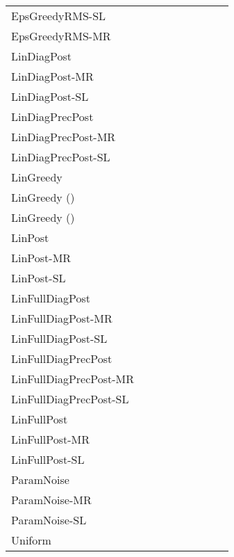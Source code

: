 \documentclass{article} \usepackage{iclr2018_conference,times}
\begin{document}
\begin{landscape}
\begin{table}[ht]
\begin{adjustbox}{center}
\begin{tabular}{lllllllll}
EpsGreedyRMS-SL & & & & & & & &  \\
EpsGreedyRMS-MR & & & & & & & &  \\
LinDiagPost & & & & & & & &  \\
LinDiagPost-MR & & & & & & & &  \\
LinDiagPost-SL & & & & & & & &  \\
LinDiagPrecPost & & & & & & & &  \\
LinDiagPrecPost-MR & & & & & & & &  \\
LinDiagPrecPost-SL & & & & & & & &  \\
LinGreedy & & & & & & & &  \\
LinGreedy () & & & & & & & &  \\
LinGreedy () & & & & & & & &  \\
LinPost & & & & & & & &  \\
LinPost-MR & & & & & & & &  \\
LinPost-SL & & & & & & & &  \\
LinFullDiagPost & & & & & & & &  \\
LinFullDiagPost-MR & & & & & & & &  \\
LinFullDiagPost-SL & & & & & & & &  \\
LinFullDiagPrecPost & & & & & & & &  \\
LinFullDiagPrecPost-MR & & & & & & & &  \\
LinFullDiagPrecPost-SL & & & & & & & &  \\
LinFullPost & & & & & & & &  \\
LinFullPost-MR & & & & & & & &  \\
LinFullPost-SL & & & & & & & &  \\
ParamNoise & & & & & & & &  \\
ParamNoise-MR & & & & & & & &  \\
ParamNoise-SL & & & & & & & &  \\
Uniform & \bm{}& \bm{}& \bm{}& \bm{}& \bm{}& \bm{}& \bm{}& \bm{} \\
\bottomrule
\end{tabular}
 	\end{adjustbox}
	\vspace*{\fill}
\end{table}
\end{landscape}
\end{document}
